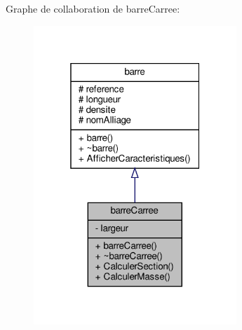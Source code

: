 Graphe de collaboration de barre\+Carree\+:
\nopagebreak
\begin{figure}[H]
\begin{center}
\leavevmode
\includegraphics[width=217pt]{classbarre_carree__coll__graph}
\end{center}
\end{figure}
